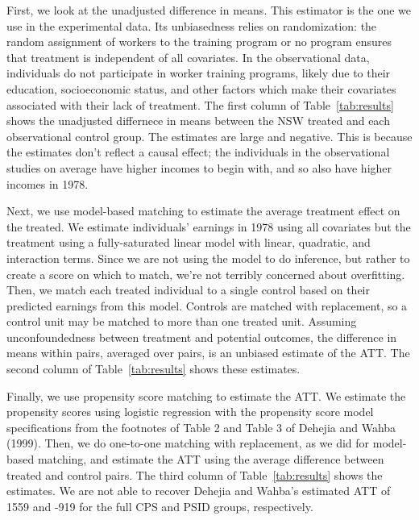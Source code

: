 \documentclass[11pt]{article}\usepackage[]{graphicx}\usepackage[]{color}
\begin{document}
First, we look at the unadjusted difference in means.
This estimator is the one we use in the experimental data.
Its unbiasedness relies on randomization: the random assignment of workers to the training program or no program ensures that treatment is independent of all covariates.
In the observational data, individuals do not participate in worker training programs, likely due to their education, socioeconomic status, and other factors which make their covariates associated with their lack of treatment.
The first column of Table~\ref{tab:results} shows the unadjusted differnece in means between the NSW treated and each observational control group.
The estimates are large and negative.
This is because the estimates don't reflect a causal effect; the individuals in the observational studies on average have higher incomes to begin with, and so also have higher incomes in 1978.

Next, we use model-based matching to estimate the average treatment effect on the treated.
We estimate individuals' earnings in 1978 using all covariates but the treatment using a fully-saturated linear model with linear, quadratic, and interaction terms.
Since we are not using the model to do inference, but rather to create a score on which to match, we're not terribly concerned about overfitting.
Then, we match each treated individual to a single control based on their predicted earnings from this model.
Controls are matched with replacement, so a control unit may be matched to more than one treated unit.
Assuming unconfoundedness between treatment and potential outcomes, the difference in means within pairs, averaged over pairs, is an unbiased estimate of the ATT.
The second column of Table~\ref{tab:results} shows these estimates.

Finally, we use propensity score matching to estimate the ATT.
We estimate the propensity scores using logistic regression with the propensity score model specifications from the footnotes of Table 2 and Table 3 of Dehejia and Wahba (1999).
Then, we do one-to-one matching with replacement, as we did for model-based matching, and estimate the ATT using the average difference between treated and control pairs.
The third column of Table~\ref{tab:results} shows the estimates.
We are not able to recover Dehejia and Wahba's estimated ATT of 1559 and -919 for the full CPS and PSID groups, respectively.
\end{document}
